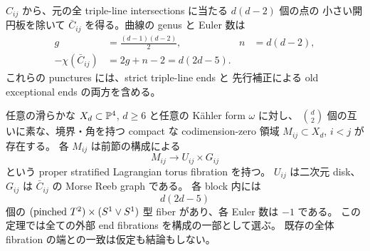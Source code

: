 $C_{ij}$ から、元の全 triple-line intersections に当たる $d(d-2)$ 個の点の
小さい開円板を除いて $\bar C_{ij}$ を得る。曲線の genus と Euler 数は
\begin{align}
g&=\frac{(d-1)(d-2)}2,& n&=d(d-2),\nonumber\\
-\chi(\bar C_{ij})&=2g+n-2=d(2d-5).\label{lc:application-pants}
\end{align}
これらの punctures には、strict triple-line ends と
先行補正による old exceptional ends の両方を含める。

\begin{theorem}[互いに素な部分領域上の実現]
\label{lc:application-local}
任意の滑らかな $X_d\subset\mathbb P^4$, $d\ge6$ と任意の Kähler form $\omega$ に対し、
$\binom d2$ 個の互いに素な、境界・角を持つ compact な codimension-zero 領域
$M_{ij}\subset X_d$, $i<j$ が存在する。
各 $M_{ij}$ は前節の構成による
\[
M_{ij}\longrightarrow U_{ij}\times G_{ij}
\]
という proper stratified Lagrangian torus fibration を持つ。
$U_{ij}$ は二次元 disk、$G_{ij}$ は $\bar C_{ij}$ の Morse Reeb graph である。
各 block 内には
\[
d(2d-5)
\]
個の $(\text{pinched }T^2)\times(S^1\vee S^1)$ 型 fiber があり、各 Euler 数は $-1$ である。
この定理では全ての外部 end fibrations を構成の一部として選ぶ。
既存の全体 fibration の端との一致は仮定も結論もしない。
\end{theorem}

